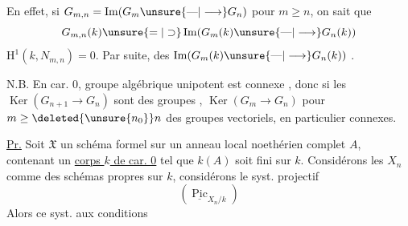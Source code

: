 


En effet, si $G_{m,n}=\operatorname{Im}(G_m\unsure{\text{---}|\longrightarrow}G_n)$ pour $m\geq n$, on sait que
\[
G_{m,n}(k)\unsure{=|\supset}\operatorname{Im}(G_m(k)\unsure{\text{---}|\longrightarrow}G_n(k))
\]
 $\mathrm H^1(k,N_{m,n})=0$. Par suite,   des $\operatorname{Im}(G_m(k)\unsure{\text{---}|\longrightarrow}G_n(k))$  .

N.B. En car. 0,  groupe algébrique  unipotent est connexe , donc si les $\operatorname{Ker}(G_{n+1}\longrightarrow G_n)$ sont des groupes ,   $\operatorname{Ker}(G_m\longrightarrow G_n)$ pour $m\geq\deleted{\unsure{n_0}}n$  des groupes vectoriels, en particulier connexes.


\uline{Pr.} Soit $\mathfrak X$ un schéma formel  sur un anneau local noethérien complet $A$, contenant un \uline{corps $k$ de car. 0} tel que  $k(A)$ soit fini sur $k$. Considérons les $X_n$ comme des schémas propres sur $k$,  considérons le syst. projectif
\[
(\underline{\operatorname{Pic}}_{X_n/k})
\]
Alors ce syst.  aux conditions


